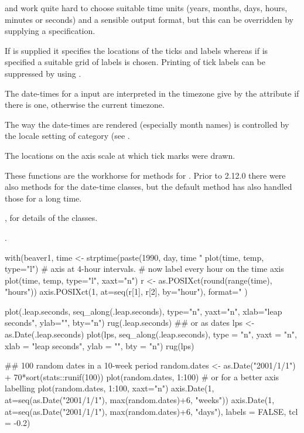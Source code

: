 %
\begin{Details}\relax
{} and  work quite hard to choose
suitable time units (years, months, days, hours, minutes or seconds)
and a sensible output format, but this can be overridden by supplying
a  specification.

If  is supplied it specifies the locations of the ticks
and labels whereas if  is specified a suitable grid of labels
is chosen. Printing of tick labels can be suppressed by using
.

The date-times for a  input are interpreted in the
timezone give by the  attribute if there is one,
otherwise the current timezone.

The way the date-times are rendered (especially month names) is
controlled by the locale setting of category  (see
.
\end{Details}
%
\begin{Value}
The locations on the axis scale at which tick marks were drawn.
\end{Value}
%
\begin{Note}\relax
These functions are the workhorse for methods for .
Prior to \R{} 2.12.0 there were also  methods for the
date-time classes, but the default method has also handled those for a
long time.
\end{Note}
%
\begin{SeeAlso}\relax
{},  for details of the classes.

.
\end{SeeAlso}
%
\begin{Examples}
\begin{ExampleCode}
with(beaver1, {
time <- strptime(paste(1990, day, time %
                 "%
plot(time, temp, type="l") # axis at 4-hour intervals.
# now label every hour on the time axis
plot(time, temp, type="l", xaxt="n")
r <- as.POSIXct(round(range(time), "hours"))
axis.POSIXct(1, at=seq(r[1], r[2], by="hour"), format="%
})

plot(.leap.seconds, seq_along(.leap.seconds), type="n", yaxt="n",
     xlab="leap seconds", ylab="", bty="n")
rug(.leap.seconds)
## or as dates
lps <- as.Date(.leap.seconds)
plot(lps, seq_along(.leap.seconds),
     type = "n", yaxt = "n", xlab = "leap seconds",
     ylab = "", bty = "n")
rug(lps)

## 100 random dates in a 10-week period
random.dates <- as.Date("2001/1/1") + 70*sort(stats::runif(100))
plot(random.dates, 1:100)
# or for a better axis labelling
plot(random.dates, 1:100, xaxt="n")
axis.Date(1, at=seq(as.Date("2001/1/1"), max(random.dates)+6, "weeks"))
axis.Date(1, at=seq(as.Date("2001/1/1"), max(random.dates)+6, "days"),
     labels = FALSE, tcl = -0.2)
\end{ExampleCode}
\end{Examples}
